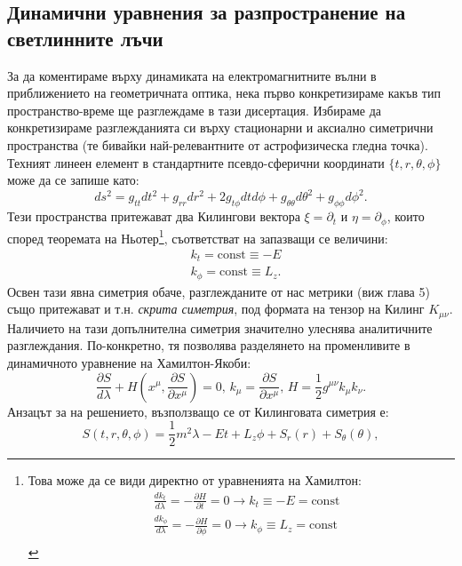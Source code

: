 \subsection{Динамични уравнения за разпространение на светлинните лъчи}
За да коментираме върху динамиката на електромагнитните вълни в приближението на геометричната оптика, нека първо конкретизираме какъв тип пространство-време ще разглеждаме в тази дисертация. Избираме да конкретизираме разглежданията си върху стационарни и аксиално симетрични пространства (те бивайки най-релевантните от астрофизическа гледна точка). Техният линеен елемент в стандартните псевдо-сферични координати $\{t,r,\theta,\phi\}$ може да се запише като:
\begin{equation}
	ds^2 = g_{tt}dt^2 + g_{rr}dr^2 + 2g_{t\phi}dtd\phi + g_{\theta\theta}d\theta^2 + g_{\phi\phi} d\phi^2. 
\end{equation}
Тези пространства притежават два Килингови вектора $\xi = \partial_t$ и $\eta = \partial_\phi$, които според теоремата на Ньотер\footnote{Това може да се види директно от уравненията на Хамилтон:
	\begin{equation*}
		\begin{aligned}
			&\frac{dk_t}{d\lambda} = - \frac{\partial H}{\partial t} = 0 \rightarrow k_t \equiv -E = \text{const}\\
			&\frac{dk_\phi}{d\lambda} = - \frac{\partial H}{\partial \phi} = 0 \rightarrow k_\phi \equiv L_z = \text{const}\\
		\end{aligned}
\end{equation*}}, съответстват на запазващи се величини:
\begin{subequations}
	\begin{align}
		&k_t = \text{const} \equiv -E\\
		&k_\phi = \text{const} \equiv L_z.
	\end{align}
\end{subequations}
Освен тази явна симетрия обаче, разглежданите от нас метрики (виж глава 5) също притежават и т.н. \emph{скрита симетрия}, под формата на тензор на Килинг $K_{\mu\nu}$. Наличието на тази допълнителна симетрия значително улеснява аналитичните разглеждания. По-конкретно, тя позволява разделянето на променливите в динамичното уравнение на Хамилтон-Якоби:
\begin{equation}
	\frac{\partial S}{d\lambda} + H\left(x^\mu,\frac{\partial S}{\partial x^\mu}\right) = 0, \,k_\mu = \frac{\partial S}{\partial x^\mu},\, H = \frac{1}{2}g^{\mu\nu}k_\mu k_\nu.
\end{equation}
Анзацът за на решението, възползващо се от Килинговата симетрия е:
\begin{equation}
	S(t,r,\theta,\phi) = \frac{1}{2}m^2\lambda -Et + L_z\phi + S_r(r) + S_\theta(\theta),
\end{equation}

